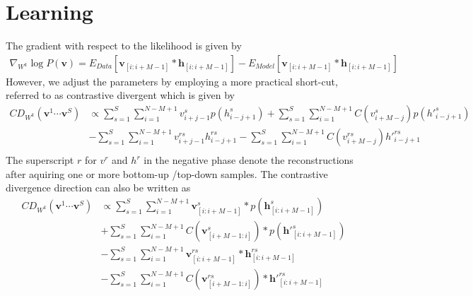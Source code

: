 \documentclass[12pt]{article}
\begin{document}
\section{Learning}
The gradient with respect to the likelihood is given by 
\begin{align}
	\nabla_{W^k} \log P(\mathbf{v}) = E_{Data}[\mathbf{v}_{[i:i+M-1]}* \mathbf{h}_{[i:i+M-1]}]-
	E_{Model}[\mathbf{v}_{[i:i+M-1]}* \mathbf{h}_{[i:i+M-1]}]
\end{align}
However, we adjust the parameters by employing a more practical
short-cut, referred to as contrastive divergent which is given by
\begin{align}
	CD_{W^k}(\mathbf{v}^1\cdots\mathbf{v}^S) &\propto 
	\sum_{s=1}^S \sum_{i=1}^{N-M+1} v_{i+j-1}^s p(h_{i-j+1}^s)+
	\sum_{s=1}^S \sum_{i=1}^{N-M+1} C(v_{i+M-j}^s) p({h'}_{i-j+1}^s)\nonumber\\
	&-\sum_{s=1}^S \sum_{i=1}^{N-M+1} v_{i+j-1}^{rs} h_{i-j+1}^{rs}
	-\sum_{s=1}^S \sum_{i=1}^{N-M+1} C(v_{i+M-j}^{rs}) {h'}_{i-j+1}^{rs}\nonumber\\
\end{align}
The superscript $r$ for $v^r$ and $h^r$ in the negative phase denote the
reconstructions after aquiring one or more bottom-up /top-down samples.
The contrastive divergence direction can also be written as
\begin{align}
	CD_{W^k}(\mathbf{v}^1\cdots\mathbf{v}^S) &\propto
	\sum_{s=1}^S \sum_{i=1}^{N-M+1}\mathbf{v}_{[i:i+M-1]}^s* p(\mathbf{h}_{[i:i+M-1]}^s)\nonumber\\
	&+\sum_{s=1}^S \sum_{i=1}^{N-M+1}C(\mathbf{v}_{[i+M-1:i]}^s)* p(\mathbf{h'}_{[i:i+M-1]}^s)\nonumber\\
	&-\sum_{s=1}^S \sum_{i=1}^{N-M+1}\mathbf{v}_{[i:i+M-1]}^{rs}* \mathbf{h}_{[i:i+M-1]}^{rs}\nonumber\\
	&-\sum_{s=1}^S \sum_{i=1}^{N-M+1}C(\mathbf{v}_{[i+M-1:i]}^{rs})* \mathbf{h'}_{[i:i+M-1]}^{rs}\nonumber
\end{align}
\end{document}
